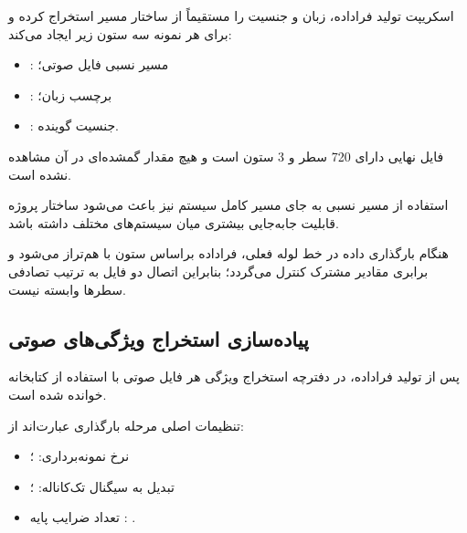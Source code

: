 \documentclass[12pt,a4paper,oneside]{report}
\begin{document}
\begin{center}
\end{center}

اسکریپت تولید فراداده، زبان و جنسیت را مستقیماً از ساختار مسیر استخراج کرده و برای هر نمونه سه ستون زیر ایجاد می‌کند:

\begin{itemize}

	\item {}: مسیر نسبی فایل صوتی؛

	\item {}: برچسب زبان؛

	\item {}: جنسیت گوینده.

\end{itemize}

فایل نهایی
دارای 720 سطر و 3 ستون است و هیچ مقدار گمشده‌ای در آن مشاهده نشده است.

استفاده از مسیر نسبی به جای مسیر کامل سیستم نیز باعث می‌شود ساختار پروژه قابلیت جابه‌جایی بیشتری میان سیستم‌های مختلف داشته باشد.

هنگام بارگذاری داده در خط لوله فعلی، فراداده براساس ستون
با
هم‌تراز می‌شود و برابری مقادیر مشترک کنترل می‌گردد؛ بنابراین اتصال دو فایل به ترتیب تصادفی سطرها وابسته نیست.


\subsection{پیاده‌سازی استخراج ویژگی‌های صوتی}

پس از تولید فراداده، در دفترچه استخراج ویژگی هر فایل صوتی با استفاده از کتابخانه
خوانده شده است.

تنظیمات اصلی مرحله بارگذاری عبارت‌اند از:

\begin{itemize}

	\item نرخ نمونه‌برداری:
	؛

	\item تبدیل به سیگنال تک‌کاناله:
	؛

	\item تعداد ضرایب پایه
	:
	.

\end{itemize}
\end{document}
